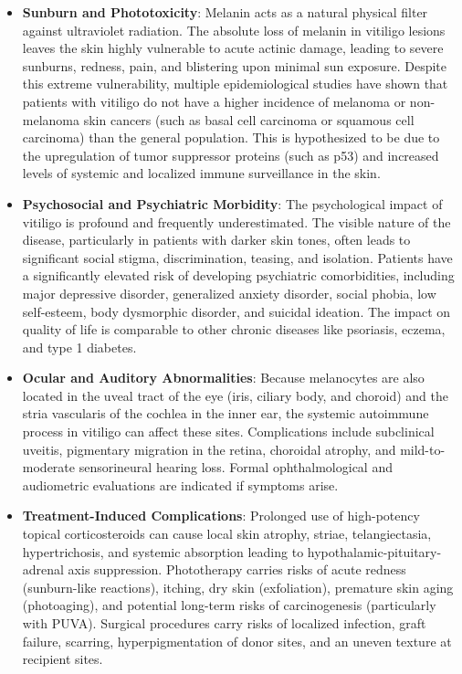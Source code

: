 \begin{itemize}
    \item \textbf{Sunburn and Phototoxicity}: Melanin acts as a natural physical filter against ultraviolet radiation. The absolute loss of melanin in vitiligo lesions leaves the skin highly vulnerable to acute actinic damage, leading to severe sunburns, redness, pain, and blistering upon minimal sun exposure. Despite this extreme vulnerability, multiple epidemiological studies have shown that patients with vitiligo do not have a higher incidence of melanoma or non-melanoma skin cancers (such as basal cell carcinoma or squamous cell carcinoma) than the general population. This is hypothesized to be due to the upregulation of tumor suppressor proteins (such as p53) and increased levels of systemic and localized immune surveillance in the skin.
    \item \textbf{Psychosocial and Psychiatric Morbidity}: The psychological impact of vitiligo is profound and frequently underestimated. The visible nature of the disease, particularly in patients with darker skin tones, often leads to significant social stigma, discrimination, teasing, and isolation. Patients have a significantly elevated risk of developing psychiatric comorbidities, including major depressive disorder, generalized anxiety disorder, social phobia, low self-esteem, body dysmorphic disorder, and suicidal ideation. The impact on quality of life is comparable to other chronic diseases like psoriasis, eczema, and type 1 diabetes.
    \item \textbf{Ocular and Auditory Abnormalities}: Because melanocytes are also located in the uveal tract of the eye (iris, ciliary body, and choroid) and the stria vascularis of the cochlea in the inner ear, the systemic autoimmune process in vitiligo can affect these sites. Complications include subclinical uveitis, pigmentary migration in the retina, choroidal atrophy, and mild-to-moderate sensorineural hearing loss. Formal ophthalmological and audiometric evaluations are indicated if symptoms arise.
    \item \textbf{Treatment-Induced Complications}: Prolonged use of high-potency topical corticosteroids can cause local skin atrophy, striae, telangiectasia, hypertrichosis, and systemic absorption leading to hypothalamic-pituitary-adrenal axis suppression. Phototherapy carries risks of acute redness (sunburn-like reactions), itching, dry skin (exfoliation), premature skin aging (photoaging), and potential long-term risks of carcinogenesis (particularly with PUVA). Surgical procedures carry risks of localized infection, graft failure, scarring, hyperpigmentation of donor sites, and an uneven texture at recipient sites.
\end{itemize}

